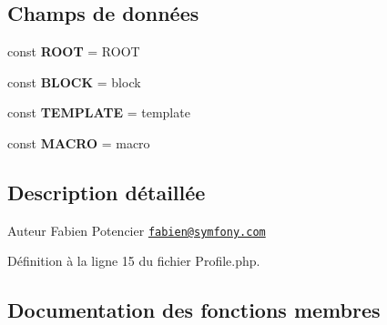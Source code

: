 \subsection*{Champs de données}
\begin{DoxyCompactItemize}
\item 
const {\bfseries R\+O\+OT} = \textquotesingle{}R\+O\+OT\textquotesingle{}\hypertarget{class_twig___profiler___profile_a18c0644836e196aed6d63779e14d6bd8}{}\label{class_twig___profiler___profile_a18c0644836e196aed6d63779e14d6bd8}

\item 
const {\bfseries B\+L\+O\+CK} = \textquotesingle{}block\textquotesingle{}\hypertarget{class_twig___profiler___profile_a21f9bc8ca6a0689323a56cea4bf5bc04}{}\label{class_twig___profiler___profile_a21f9bc8ca6a0689323a56cea4bf5bc04}

\item 
const {\bfseries T\+E\+M\+P\+L\+A\+TE} = \textquotesingle{}template\textquotesingle{}\hypertarget{class_twig___profiler___profile_a0c2e267c27b722d0c15ae21215cda92e}{}\label{class_twig___profiler___profile_a0c2e267c27b722d0c15ae21215cda92e}

\item 
const {\bfseries M\+A\+C\+RO} = \textquotesingle{}macro\textquotesingle{}\hypertarget{class_twig___profiler___profile_aa27d7676d16112ba2e0089038f3f77c3}{}\label{class_twig___profiler___profile_aa27d7676d16112ba2e0089038f3f77c3}

\end{DoxyCompactItemize}


\subsection{Description détaillée}
\begin{DoxyAuthor}{Auteur}
Fabien Potencier \href{mailto:fabien@symfony.com}{\tt fabien@symfony.\+com} 
\end{DoxyAuthor}


Définition à la ligne 15 du fichier Profile.\+php.



\subsection{Documentation des fonctions membres}
